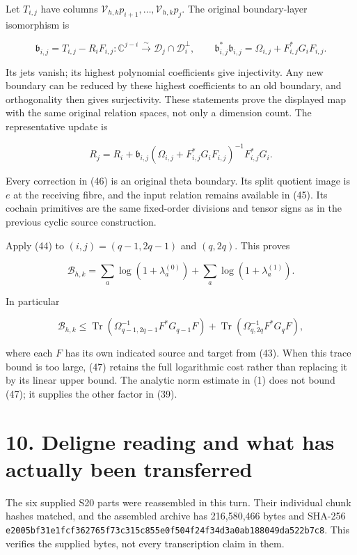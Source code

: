 Let \(T_{i,j}\) have columns \(\mathcal V_{h,k}p_{i+1},\ldots,
\mathcal V_{h,k}p_j\). The original boundary-layer isomorphism is

\[
 \mathfrak b_{i,j}=T_{i,j}-R_iF_{i,j}:
 \mathbb{C}^{j-i}\xrightarrow{\sim}
 \mathcal D_j\cap\mathcal D_i^\perp,
 \qquad
 \mathfrak b_{i,j}^*\mathfrak b_{i,j}
 =\Omega_{i,j}+F_{i,j}^*G_iF_{i,j}.                                     \tag{45}
\]

Its jets vanish; its highest polynomial coefficients give injectivity.
Any new boundary can be reduced by these highest coefficients to an old
boundary, and orthogonality then gives surjectivity. These statements
prove the displayed map with the same original relation spaces, not only
a dimension count. The representative update is

\[
 R_j=R_i+
 \mathfrak b_{i,j}
 (\Omega_{i,j}+F_{i,j}^*G_iF_{i,j})^{-1}F_{i,j}^*G_i.                    \tag{46}
\]

Every correction in (46) is an original theta boundary. Its split
quotient image is \(e\) at the receiving fibre, and the input relation
remains available in (45). Its cochain primitives are the same
fixed-order divisions and tensor signs as in the previous cyclic source
construction.

Apply (44) to \((i,j)=(q-1,2q-1)\) and \((q,2q)\). This proves

\[
 \boxed{\mathcal B_{h,k}
 =\sum_a\log(1+\lambda_a^{(0)})
   +\sum_a\log(1+\lambda_a^{(1)}).}                                    \tag{47}
\]

In particular

\[
 \mathcal B_{h,k}\le
 \operatorname{Tr}(\Omega_{q-1,2q-1}^{-1}F^*G_{q-1}F)
 +\operatorname{Tr}(\Omega_{q,2q}^{-1}F^*G_qF),                          \tag{48}
\]

where each \(F\) has its own indicated source and target from (43). When
this trace bound is too large, (47) retains the full logarithmic cost
rather than replacing it by its linear upper bound. The analytic norm
estimate in (1) does not bound (47); it supplies the other factor in
(39).

\section{10. Deligne reading and what has actually been
transferred}\label{deligne-reading-and-what-has-actually-been-transferred}

The six supplied S20 parts were reassembled in this turn. Their
individual chunk hashes matched, and the assembled archive has
216,580,466 bytes and SHA-256
\nolinkurl{e2005bf31e1fcf362765f73c315c855e0f504f24f34d3a0ab188049da522b7c8}.
This verifies the supplied bytes, not every transcription claim in them.

